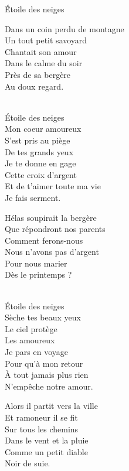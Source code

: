 \documentclass{novel}
\begin{document}
\newpage
\normalsize

\h*{Étoile des neiges}
\begin{multicols}{2}
Dans un coin perdu de montagne \\
Un tout petit savoyard \\
Chantait son amour \\
Dans le calme du soir \\
Près de sa bergère \\
Au doux regard. \\

\begin{bfseries}
[Refrain 1:] \\
Étoile des neiges \\
Mon coeur amoureux \\
S'est pris au piège \\
De tes grands yeux \\
Je te donne en gage \\
Cette croix d'argent \\
Et de t'aimer toute ma vie \\
Je fais serment. \\
\end{bfseries}

Hélas soupirait la bergère \\
Que répondront nos parents \\
Comment ferons-nous \\
Nous n'avons pas d'argent \\
Pour nous marier \\
Dès le printemps ? \\

\begin{bfseries}
[Refrain 2:] \\
Étoile des neiges \\
Sèche tes beaux yeux \\
Le ciel protège \\
Les amoureux \\
Je pars en voyage \\
Pour qu'à mon retour \\
À tout jamais plus rien \\
N'empêche notre amour. \\
\end{bfseries}

Alors il partit vers la ville \\
Et ramoneur il se fit \\
Sur tous les chemins \\
Dans le vent et la pluie \\
Comme un petit diable \\
Noir de suie. \\



\end{multicols}
\end{document}
